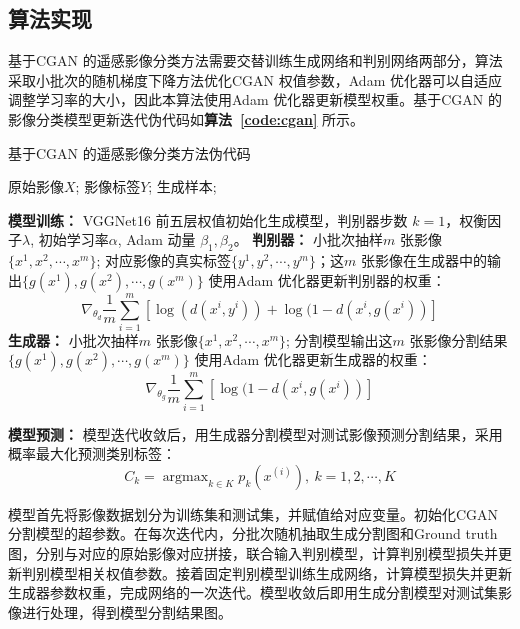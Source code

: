 \subsection{算法实现}
\label{subsec:firtst-2}

基于CGAN 的遥感影像分类方法需要交替训练生成网络和判别网络两部分，算法采取小批次的随机梯度下降方法优化CGAN 权值参数，Adam \cite{kingma2014adam} 优化器可以自适应调整学习率的大小，因此本算法使用Adam 优化器更新模型权重。基于CGAN 的影像分类模型更新迭代伪代码如\textbf{算法~\ref{code:cgan}} 所示。

\begin{algorithm}[!h]
  \caption{基于CGAN 的遥感影像分类方法伪代码}
  \begin{algorithmic}[1]
    \Require
      原始影像$X$; 影像标签$Y$;
    \Ensure
      生成样本;

   \textbf{模型训练：}
    \State VGGNet16 前五层权值初始化生成模型，判别器步数 $k= 1$，权衡因子$\lambda$, 初始学习率$\alpha$, Adam 动量 $\beta_1,\beta_2$。
        \State \textbf{判别器：}
        \State 小批次抽样$m$ 张影像$\{x^1,x^2,\cdots, x^m\}$; 对应影像的真实标签$\{y^1,y^2,\cdots, y^m\}$；这$m$ 张影像在生成器中的输出$\{g(x^1),g(x^2),\cdots, g(x^m) \}$
        \State 使用Adam 优化器更新判别器的权重：
        $$
        \nabla_{\theta_d} \frac{1}{m} \sum_{i=1} ^m [\log(d(x^i,y^i)) + \log(1-d(x^i,g(x^i)) ]
        $$
        \EndFor
        \State \textbf{生成器：}
        \State 小批次抽样$m$ 张影像$\{x^1,x^2,\cdots, x^m\}$;
        \State 分割模型输出这$m$ 张影像分割结果$\{g(x^1),g(x^2),\cdots, g(x^m) \}$
        \State 使用Adam 优化器更新生成器的权重：
        $$
        \nabla_{\theta_g} \frac{1}{m} \sum_{i=1} ^m [\log(1-d(x^i,g(x^i))]
        $$
    \EndFor

  \textbf{模型预测：}
    \State 模型迭代收敛后，用生成器分割模型对测试影像预测分割结果，采用概率最大化预测类别标签：
    $$
    C_k = \mathop{\arg\max}_{k \in K} p_k(x^{(i)}), \ k=1,2,\cdots,K
    $$
      
  \end{algorithmic}
  \label{code:cgan}
\end{algorithm}


模型首先将影像数据划分为训练集和测试集，并赋值给对应变量。初始化CGAN 分割模型的超参数。在每次迭代内，分批次随机抽取生成分割图和Ground truth 图，分别与对应的原始影像对应拼接，联合输入判别模型，计算判别模型损失并更新判别模型相关权值参数。接着固定判别模型训练生成网络，计算模型损失并更新生成器参数权重，完成网络的一次迭代。模型收敛后即用生成分割模型对测试集影像进行处理，得到模型分割结果图。



